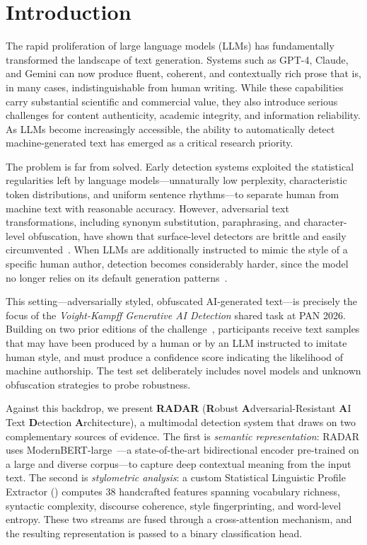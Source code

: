 
\section{Introduction}
\label{sec:introduction}

The rapid proliferation of large language models (LLMs) has fundamentally transformed the landscape of text generation. Systems such as GPT-4, Claude, and Gemini can now produce fluent, coherent, and contextually rich prose that is, in many cases, indistinguishable from human writing. While these capabilities carry substantial scientific and commercial value, they also introduce serious challenges for content authenticity, academic integrity, and information reliability. As LLMs become increasingly accessible, the ability to automatically detect machine-generated text has emerged as a critical research priority.

The problem is far from solved. Early detection systems exploited the statistical regularities left by language models—unnaturally low perplexity, characteristic token distributions, and uniform sentence rhythms—to separate human from machine text with reasonable accuracy. However, adversarial text transformations, including synonym substitution, paraphrasing, and character-level obfuscation, have shown that surface-level detectors are brittle and easily circumvented~\cite{sadasivan:2023}. When LLMs are additionally instructed to mimic the style of a specific human author, detection becomes considerably harder, since the model no longer relies on its default generation patterns~\cite{jakesch:2023}.

This setting—adversarially styled, obfuscated AI-generated text—is precisely the focus of the \textit{Voight-Kampff Generative AI Detection} shared task at PAN 2026. Building on two prior editions of the challenge~\cite{bevendorff:2024d,bevendorff:2025d}, participants receive text samples that may have been produced by a human or by an LLM instructed to imitate human style, and must produce a confidence score indicating the likelihood of machine authorship. The test set deliberately includes novel models and unknown obfuscation strategies to probe robustness.

Against this backdrop, we present \textbf{RADAR} (\textbf{R}obust \textbf{A}dversarial-Resistant \textbf{A}I Text \textbf{D}etection \textbf{A}rchitecture), a multimodal detection system that draws on two complementary sources of evidence. The first is \textit{semantic representation}: RADAR uses ModernBERT-large~\cite{modernbert:2024}—a state-of-the-art bidirectional encoder pre-trained on a large and diverse corpus—to capture deep contextual meaning from the input text. The second is \textit{stylometric analysis}: a custom Statistical Linguistic Profile Extractor (\slpe) computes 38 handcrafted features spanning vocabulary richness, syntactic complexity, discourse coherence, style fingerprinting, and word-level entropy. These two streams are fused through a cross-attention mechanism, and the resulting representation is passed to a binary classification head.

